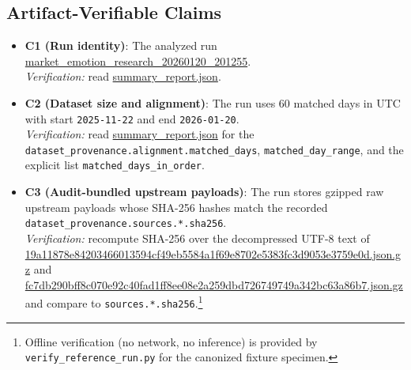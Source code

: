 \documentclass[12pt,a4paper]{report}
\begin{document}
\subsection{Artifact-Verifiable Claims}

\begin{itemize}
	\item \textbf{C1 (Run identity)}: The analyzed run \\ \href{https://github.com/jhcragin/SpiralBrain-v3.0-public/tree/main/market_emotion_risk_posture/results}{market_emotion_research_20260120_201255}. \\
	\emph{Verification:} read \href{https://github.com/jhcragin/SpiralBrain-v3.0-public/blob/main/market_emotion_risk_posture/results/summary_report.json}{summary_report.json}.

	\item \textbf{C2 (Dataset size and alignment)}: The run uses 60 matched days in UTC with start \texttt{2025-11-22} and end \texttt{2026-01-20}. \\
	\emph{Verification:} read \href{https://github.com/jhcragin/SpiralBrain-v3.0-public/blob/main/market_emotion_risk_posture/results/summary_report.json}{summary_report.json} for the \texttt{dataset\_provenance.alignment.matched\_days}, \texttt{matched\_day\_range}, and the explicit list \texttt{matched\_days\_in\_order}.

	\item \textbf{C3 (Audit-bundled upstream payloads)}: The run stores gzipped raw upstream payloads whose SHA-256 hashes match the recorded \\ \texttt{dataset\_provenance.sources.*.sha256}. \\
	\emph{Verification:} recompute SHA-256 over the decompressed UTF-8 text of \\ \href{https://github.com/jhcragin/SpiralBrain-v3.0-public/blob/main/market_emotion_risk_posture/results/provenance/raw/19a11878e84203466013594cf49eb5584a1f69e8702e5383fc3d9053e3759e0d.json.gz}{19a11878e84203466013594cf49eb5584a1f69e8702e5383fc3d9053e3759e0d.json.gz} and \\ \href{https://github.com/jhcragin/SpiralBrain-v3.0-public/blob/main/market_emotion_risk_posture/results/provenance/raw/fc7db290bff8c070e92c40fad1ff8ee08e2a259dbd726749749a342bc63a86b7.json.gz}{fc7db290bff8c070e92c40fad1ff8ee08e2a259dbd726749749a342bc63a86b7.json.gz} and compare to \texttt{sources.*.sha256}.\footnote{Offline verification (no network, no inference) is provided by \texttt{verify\_reference\_run.py} for the canonized fixture specimen.}


\end{itemize}
\end{document}
